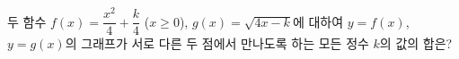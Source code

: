 두 함수 $f(x)=\dfrac{x^2}{4}+\dfrac{k}{4}$ ($x\ge 0$), $g(x)=\sqrt{4x-k}$에 대하여 $y=f(x)$, $y=g(x)$의 그래프가 서로 다른 두 점에서 만나도록 하는 모든 정수 $k$의 값의 합은?
